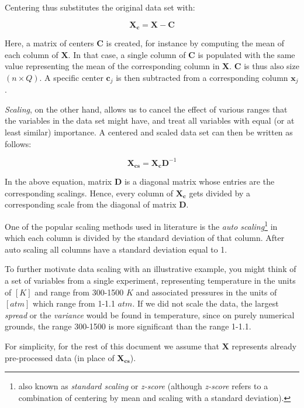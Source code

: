 \documentclass[10pt,twocolumn]{article}
\begin{document}
Centering thus substitutes the original data set with:

\begin{equation}
\mathbf{X_c} = \mathbf{X} - \mathbf{C}
\end{equation}

Here, a matrix of centers $\mathbf{C}$ is created, for instance by computing the mean of each column of $\mathbf{X}$. In that case, a single column of $\mathbf{C}$ is populated with the same value representing the mean of the corresponding column in $\mathbf{X}$. $\mathbf{C}$ is thus also size $(n \times Q)$. A specific center $\mathbf{c}_j$ is then subtracted from a corresponding column $\mathbf{x}_j$.

\textit{Scaling}, on the other hand, allows us to cancel the effect of various ranges that the variables in the data set might have, and treat all variables with equal (or at least similar) importance. A centered and scaled data set can then be written as follows:

\begin{equation}
\mathbf{X_{cs}} = \mathbf{X_c}\mathbf{D}^{-1}
\end{equation}

In the above equation, matrix $\mathbf{D}$ is a diagonal matrix whose entries are the corresponding scalings. Hence, every column of $\mathbf{X_c}$ gets divided by a corresponding scale from the diagonal of matrix $\mathbf{D}$.

One of the popular scaling methods used in literature is the \textit{auto scaling}\footnote{also known as \textit{standard scaling} or \textit{z-score} (although \textit{z-score} refers to a combination of centering by mean and scaling with a standard deviation).} in which each column is divided by the standard deviation of that column. After auto scaling all columns have a standard deviation equal to 1.

To further motivate data scaling with an illustrative example, you might think of a set of variables from a single experiment, representing temperature in the units of $[K]$ and range from 300-1500 $K$ and associated pressures in the units of $[atm]$ which range from 1-1.1 $atm$. If we did not scale the data, the largest \textit{spread} or the \textit{variance} would be found in temperature, since on purely numerical grounds, the range 300-1500 is more significant than the range 1-1.1.

For simplicity, for the rest of this document we assume that $\mathbf{X}$ represents already pre-processed data (in place of $\mathbf{X_{cs}}$).
\end{document}
